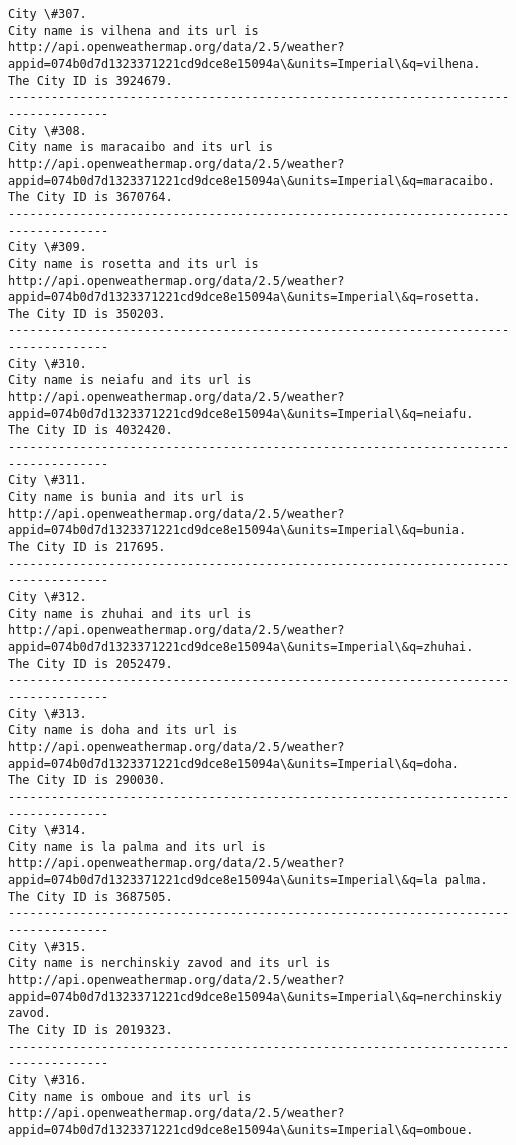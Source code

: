 \documentclass[11pt]{article}
\begin{document}
\begin{Verbatim}[commandchars=\\\{\}]
City \#307.
City name is vilhena and its url is http://api.openweathermap.org/data/2.5/weather?appid=074b0d7d1323371221cd9dce8e15094a\&units=Imperial\&q=vilhena.
The City ID is 3924679.
------------------------------------------------------------------------------------
City \#308.
City name is maracaibo and its url is http://api.openweathermap.org/data/2.5/weather?appid=074b0d7d1323371221cd9dce8e15094a\&units=Imperial\&q=maracaibo.
The City ID is 3670764.
------------------------------------------------------------------------------------
City \#309.
City name is rosetta and its url is http://api.openweathermap.org/data/2.5/weather?appid=074b0d7d1323371221cd9dce8e15094a\&units=Imperial\&q=rosetta.
The City ID is 350203.
------------------------------------------------------------------------------------
City \#310.
City name is neiafu and its url is http://api.openweathermap.org/data/2.5/weather?appid=074b0d7d1323371221cd9dce8e15094a\&units=Imperial\&q=neiafu.
The City ID is 4032420.
------------------------------------------------------------------------------------
City \#311.
City name is bunia and its url is http://api.openweathermap.org/data/2.5/weather?appid=074b0d7d1323371221cd9dce8e15094a\&units=Imperial\&q=bunia.
The City ID is 217695.
------------------------------------------------------------------------------------
City \#312.
City name is zhuhai and its url is http://api.openweathermap.org/data/2.5/weather?appid=074b0d7d1323371221cd9dce8e15094a\&units=Imperial\&q=zhuhai.
The City ID is 2052479.
------------------------------------------------------------------------------------
City \#313.
City name is doha and its url is http://api.openweathermap.org/data/2.5/weather?appid=074b0d7d1323371221cd9dce8e15094a\&units=Imperial\&q=doha.
The City ID is 290030.
------------------------------------------------------------------------------------
City \#314.
City name is la palma and its url is http://api.openweathermap.org/data/2.5/weather?appid=074b0d7d1323371221cd9dce8e15094a\&units=Imperial\&q=la palma.
The City ID is 3687505.
------------------------------------------------------------------------------------
City \#315.
City name is nerchinskiy zavod and its url is http://api.openweathermap.org/data/2.5/weather?appid=074b0d7d1323371221cd9dce8e15094a\&units=Imperial\&q=nerchinskiy zavod.
The City ID is 2019323.
------------------------------------------------------------------------------------
City \#316.
City name is omboue and its url is http://api.openweathermap.org/data/2.5/weather?appid=074b0d7d1323371221cd9dce8e15094a\&units=Imperial\&q=omboue.

\end{Verbatim}
\end{document}
